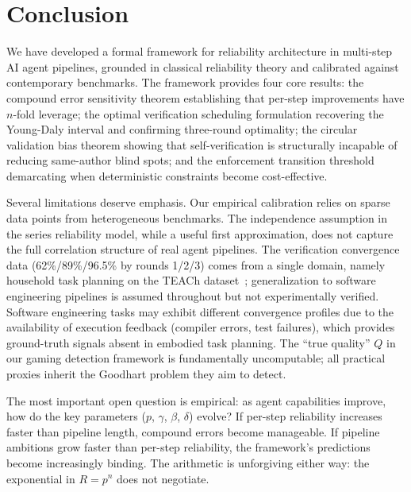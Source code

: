 \documentclass[11pt, a4paper, copyright]{googledeepmind}
\begin{document}
\section{Conclusion}
\label{sec:conclusion}

We have developed a formal framework for reliability architecture in multi-step AI agent pipelines, grounded in classical reliability theory and calibrated against contemporary benchmarks.
The framework provides four core results: the compound error sensitivity theorem establishing that per-step improvements have $n$-fold leverage; the optimal verification scheduling formulation recovering the Young-Daly interval and confirming three-round optimality; the circular validation bias theorem showing that self-verification is structurally incapable of reducing same-author blind spots; and the enforcement transition threshold demarcating when deterministic constraints become cost-effective.

Several limitations deserve emphasis.
Our empirical calibration relies on sparse data points from heterogeneous benchmarks.
The independence assumption in the series reliability model, while a useful first approximation, does not capture the full correlation structure of real agent pipelines.
The verification convergence data (62\%/89\%/96.5\% by rounds 1/2/3) comes from a single domain, namely household task planning on the TEACh dataset~\citep{hariharan2025plan}; generalization to software engineering pipelines is assumed throughout but not experimentally verified.
Software engineering tasks may exhibit different convergence profiles due to the availability of execution feedback (compiler errors, test failures), which provides ground-truth signals absent in embodied task planning.
The ``true quality'' $Q$ in our gaming detection framework is fundamentally uncomputable; all practical proxies inherit the Goodhart problem they aim to detect.

The most important open question is empirical: as agent capabilities improve, how do the key parameters ($p$, $\gamma$, $\beta$, $\delta$) evolve?
If per-step reliability increases faster than pipeline length, compound errors become manageable.
If pipeline ambitions grow faster than per-step reliability, the framework's predictions become increasingly binding.
The arithmetic is unforgiving either way: the exponential in $R = p^n$ does not negotiate.
\end{document}
